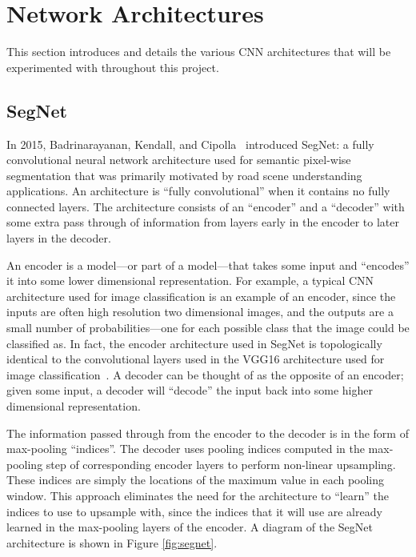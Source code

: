 \section{Network Architectures}

This section introduces and details the various CNN architectures that will be experimented with throughout this project.

\subsection{SegNet}

In 2015, Badrinarayanan, Kendall, and Cipolla~\cite{segnet} introduced SegNet: a fully convolutional neural network architecture used for semantic pixel-wise segmentation that was primarily motivated by road scene understanding applications. An architecture is ``fully convolutional'' when it contains no fully connected layers. The architecture consists of an ``encoder'' and a ``decoder'' with some extra pass through of information from layers early in the encoder to later layers in the decoder.

An encoder is a model---or part of a model---that takes some input and ``encodes'' it into some lower dimensional representation. For example, a typical CNN architecture used for image classification is an example of an encoder, since the inputs are often high resolution two dimensional images, and the outputs are a small number of probabilities---one for each possible class that the image could be classified as. In fact, the encoder architecture used in SegNet is topologically identical to the convolutional layers used in the VGG16 architecture used for image classification~\cite{segnet, vgg16}. A decoder can be thought of as the opposite of an encoder; given some input, a decoder will ``decode'' the input back into some higher dimensional representation.


The information passed through from the encoder to the decoder is in the form of max-pooling ``indices''. The decoder uses pooling indices computed in the max-pooling step of corresponding encoder layers to perform non-linear upsampling. These indices are simply the locations of the maximum value in each pooling window. This approach eliminates the need for the architecture to ``learn'' the indices to use to upsample with, since the indices that it will use are already learned in the max-pooling layers of the encoder. A diagram of the SegNet architecture is shown in Figure \ref{fig:segnet}.

